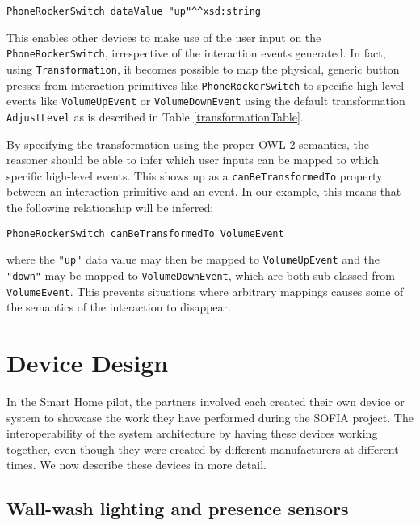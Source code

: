 \begin{verbatim}
PhoneRockerSwitch dataValue "up"^^xsd:string
\end{verbatim}

This enables other devices to make use of the user input on the \texttt{PhoneRockerSwitch}, irrespective of the interaction events generated. In fact, using \texttt{Transformation}, it becomes possible to map the physical, generic button presses from interaction primitives like \texttt{Phone\-Rocker\-Switch} to specific high-level events like \texttt{VolumeUpEvent} or
\texttt{Volume\-Down\-Event} using the default transformation \texttt{AdjustLevel} as is described in Table \ref{transformationTable}.

By specifying the transformation using the proper \ac{OWL} 2 semantics, the reasoner should be able to infer which user inputs can be mapped to which specific high-level events. This shows up as a \texttt{canBeTransformedTo} property between an interaction primitive and an event. In our example, this means that the following relationship will be inferred:

\begin{verbatim}
PhoneRockerSwitch canBeTransformedTo VolumeEvent
\end{verbatim}

where the \texttt{"up"} data value may then be mapped to \texttt{VolumeUpEvent} and the \texttt{"down"} may be mapped to \texttt{VolumeDownEvent}, which are both sub-classed from \texttt{VolumeEvent}. This prevents situations where arbitrary mappings causes some of the semantics of the interaction to disappear.


\section{Device Design}

In the Smart Home pilot, the partners involved each created their own device or system to showcase the work they have performed during the \ac{SOFIA} project. The interoperability of the system architecture by having these devices working together, even though they were created by different manufacturers at different times. We now describe these devices in more detail.

\subsection{Wall-wash lighting and presence sensors}

